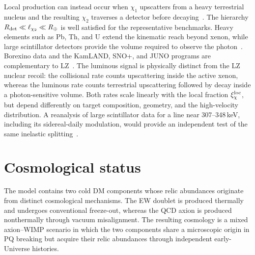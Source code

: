 \documentclass[aps,prd,reprint,preprintnumbers,superscriptaddress,nofootinbib,floatfix]{revtex4-2}
\begin{document}
Local production can instead occur when $\chi_1$ upscatters from a heavy terrestrial nucleus and the resulting $\chi_2$ traverses a detector before decaying~\cite{Feldstein:2010su,Eby:2019mgs}. The hierarchy $R_{\rm det}\ll\ell_{\chi_2}\ll R_\oplus$ is well satisfied for the representative benchmarks. Heavy elements such as Pb, Th, and U extend the kinematic reach beyond xenon, while large scintillator detectors provide the volume required to observe the photon~\cite{Graham:2024syw}. Borexino data and the KamLAND, SNO+, and JUNO programs are complementary to LZ~\cite{Eby:2019mgs,Graham:2024syw}. The luminous signal is physically distinct from the LZ nuclear recoil: the collisional rate counts upscattering inside the active xenon, whereas the luminous rate counts terrestrial upscattering followed by decay inside a photon-sensitive volume. Both rates scale linearly with the local fraction $\xi_\chi^{\rm loc}$, but depend differently on target composition, geometry, and the high-velocity distribution. A reanalysis of large scintillator data for a line near 307--348\,keV, including its sidereal-daily modulation, would provide an independent test of the same inelastic splitting~\cite{Eby:2019mgs,Graham:2024syw}.

\section{Cosmological status}
\label{sec:cosmology}

The model contains two cold DM components whose relic abundances originate from distinct cosmological mechanisms. The EW doublet is produced thermally and undergoes conventional freeze-out, whereas the QCD axion is produced nonthermally through vacuum misalignment. The resulting cosmology is a mixed axion--WIMP scenario in which the two components share a microscopic origin in PQ breaking but acquire their relic abundances through independent early-Universe histories.
\end{document}
